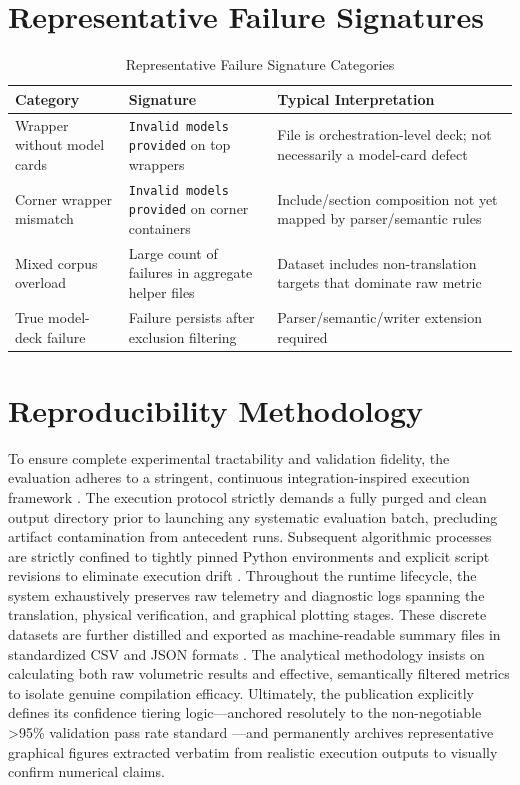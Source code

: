 \documentclass[12pt,a4paper,oneside]{report}
\begin{document}
\chapter{Representative Failure Signatures}

\begin{table}[H]
\centering
\caption{Representative Failure Signature Categories}
\label{tab:fail-sig}
\begin{tabular}{p{3.1cm}p{3.8cm}p{8.0cm}}
\toprule
Category & Signature & Typical Interpretation \\
\midrule
Wrapper without model cards & \texttt{Invalid models provided} on top wrappers & File is orchestration-level deck; not necessarily a model-card defect \\
Corner wrapper mismatch & \texttt{Invalid models provided} on corner containers & Include/section composition not yet mapped by parser/semantic rules \\
Mixed corpus overload & Large count of failures in aggregate helper files & Dataset includes non-translation targets that dominate raw metric \\
True model-deck failure & Failure persists after exclusion filtering & Parser/semantic/writer extension required \\
\bottomrule
\end{tabular}
\end{table}

\chapter{Reproducibility Methodology}

To ensure complete experimental tractability and validation fidelity, the evaluation adheres to a stringent, continuous integration-inspired execution framework \cite{edacurry}. The execution protocol strictly demands a fully purged and clean output directory prior to launching any systematic evaluation batch, precluding artifact contamination from antecedent runs. Subsequent algorithmic processes are strictly confined to tightly pinned Python environments and explicit script revisions to eliminate execution drift \cite{software_lockin}. Throughout the runtime lifecycle, the system exhaustively preserves raw telemetry and diagnostic logs spanning the translation, physical verification, and graphical plotting stages. These discrete datasets are further distilled and exported as machine-readable summary files in standardized CSV and JSON formats \cite{llm_eda_dataset}. The analytical methodology insists on calculating both raw volumetric results and effective, semantically filtered metrics to isolate genuine compilation efficacy. Ultimately, the publication explicitly defines its confidence tiering logic—anchored resolutely to the non-negotiable >95\% validation pass rate standard \cite{autospice}—and permanently archives representative graphical figures extracted verbatim from realistic execution outputs to visually confirm numerical claims.
\end{document}
